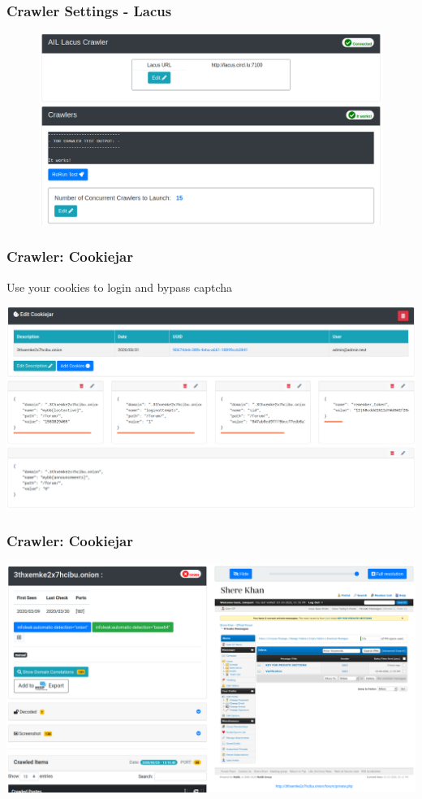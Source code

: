 \documentclass[aspectratio=169]{beamer}
\begin{document}
\begin{frame}
	\frametitle{Crawler Settings - Lacus}
		\begin{figure}
		    \includegraphics[scale=0.28]{screenshot/crawler_settings.png}
		\end{figure}
\end{frame}

\begin{frame}
    \frametitle{Crawler: Cookiejar}
    Use your cookies to login and bypass captcha
    \centerline{
        \includegraphics[scale=0.23]{screenshot/crawler-cookiejar-edit.png}
    }
\end{frame}

\begin{frame}
    \frametitle{Crawler: Cookiejar}
    \centerline{
        \includegraphics[scale=0.23]{screenshot/crawler-cookiejar-domain-crawled.png}
    }
\end{frame}
\end{document}
